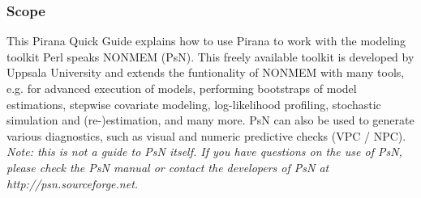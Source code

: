 \begin{center}
   {\colorbox{grey2}{
         \begin{minipage}[t]{0.9\textwidth}
\subsubsection*{Scope}
This Pirana Quick Guide explains how to use Pirana to work with the
modeling toolkit Perl speaks NONMEM (PsN). This freely available
toolkit is developed by Uppsala University and extends the
funtionality of NONMEM with many tools, e.g. for advanced execution of
models, performing bootstraps of model estimations, stepwise covariate
modeling, log-likelihood profiling, stochastic simulation and
(re-)estimation, and many more. PsN can also be used to generate
various diagnostics, such as visual and numeric predictive checks (VPC
/ NPC). \\

\textit{Note: this is not a guide to PsN itself. If you have questions
  on the use of PsN, please check the PsN manual or contact the
  developers of PsN at http://psn.sourceforge.net.}
          \end{minipage}
      }
   }
\end{center}

